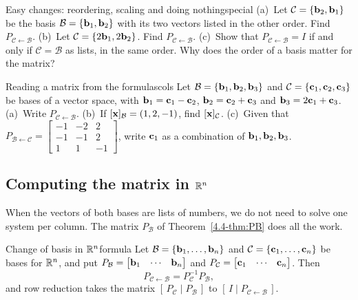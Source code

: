 \documentclass[11pt]{article}
\begin{document}
\begin{think}{Easy changes: reordering, scaling and doing nothing}{special}
(a)~Let $\mathcal{C}=\{\mathbf{b}_2,\mathbf{b}_1\}$ be the basis $\mathcal{B}=\{\mathbf{b}_1,\mathbf{b}_2\}$ with its two vectors listed in the other order. Find $P_{\mathcal{C}\leftarrow\mathcal{B}}$. (b)~Let $\mathcal{C}=\{2\mathbf{b}_1,2\mathbf{b}_2\}$. Find $P_{\mathcal{C}\leftarrow\mathcal{B}}$. (c)~Show that $P_{\mathcal{C}\leftarrow\mathcal{B}}=I$ if and only if $\mathcal{C}=\mathcal{B}$ as lists, in the same order. Why does the order of a basis matter for the matrix?
\end{think}

\begin{kc}{Reading a matrix from the formulas}{cols}
Let $\mathcal{B}=\{\mathbf{b}_1,\mathbf{b}_2,\mathbf{b}_3\}$ and $\mathcal{C}=\{\mathbf{c}_1,\mathbf{c}_2,\mathbf{c}_3\}$ be bases of a vector space, with $\mathbf{b}_1=\mathbf{c}_1-\mathbf{c}_2$, $\mathbf{b}_2=\mathbf{c}_2+\mathbf{c}_3$ and $\mathbf{b}_3=2\mathbf{c}_1+\mathbf{c}_3$. (a)~Write $P_{\mathcal{C}\leftarrow\mathcal{B}}$. (b)~If $[\mathbf{x}]_{\mathcal{B}}=(1,2,-1)$, find $[\mathbf{x}]_{\mathcal{C}}$. (c)~Given that $P_{\mathcal{B}\leftarrow\mathcal{C}}=\begin{bmatrix}-1&-2&2\\-1&-1&2\\1&1&-1\end{bmatrix}$, write $\mathbf{c}_1$ as a combination of $\mathbf{b}_1,\mathbf{b}_2,\mathbf{b}_3$.
\end{kc}

\subsection*{Computing the matrix in $\mathbb{R}^n$}

When the vectors of both bases are lists of numbers, we do not need to solve one system per column. The matrix $P_{\mathcal{B}}$ of Theorem~\ref{4.4-thm:PB} does all the work.

\begin{thm}{Change of basis in $\mathbb{R}^n$}{formula}
Let $\mathcal{B}=\{\mathbf{b}_1,\dots,\mathbf{b}_n\}$ and $\mathcal{C}=\{\mathbf{c}_1,\dots,\mathbf{c}_n\}$ be bases for $\mathbb{R}^n$, and put $P_{\mathcal{B}}=\begin{bmatrix}\mathbf{b}_1&\cdots&\mathbf{b}_n\end{bmatrix}$ and $P_{\mathcal{C}}=\begin{bmatrix}\mathbf{c}_1&\cdots&\mathbf{c}_n\end{bmatrix}$. Then
\[
P_{\mathcal{C}\leftarrow\mathcal{B}}=P_{\mathcal{C}}^{-1}P_{\mathcal{B}},
\]
and row reduction takes the matrix $[\,P_{\mathcal{C}}\mid P_{\mathcal{B}}\,]$ to $[\,I\mid P_{\mathcal{C}\leftarrow\mathcal{B}}\,]$.
\end{thm}
\end{document}
